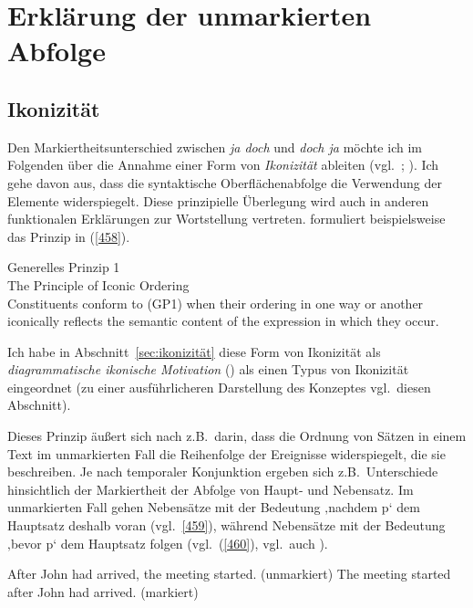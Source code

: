 \section{Erklärung der unmarkierten Abfolge}
\label{sec:unmarkiert} 
\subsection{Ikonizität}
Den Markiertheitsunterschied zwischen \textit{ja doch} und \textit{doch ja} möchte ich im Folgenden über die Annahme einer Form von \textit{Ikonizität} ableiten (vgl.\ \citealt[197--200]{Mueller2014a}; \citeyear[223--226]{Mueller2017b}). Ich gehe davon aus, dass die syntaktische Oberflächenabfolge die Verwendung der Elemente widerspiegelt. Diese prinzipielle Überlegung wird auch in anderen funktionalen Erklärungen zur Wortstellung vertreten. \citet[399]{Dik1997} formuliert beispielsweise das Prinzip in (\ref{458}).
\begin{exe}
	\ex\label{458} Generelles Prinzip 1\\
 		The Principle of Iconic Ordering\\
		Constituents  conform to (GP1) when their ordering in one way or another iconically reflects the semantic 				content of the expression in which they occur. 
	\hfill\hbox{\citet[399]{Dik1997}}
\end{exe}
Ich habe in Abschnitt~\ref{sec:ikonizität} diese Form von Ikonizität als \textit{diagrammatische ikonische Motivation} (\citealt[516]{Haiman1980})  als einen Typus von Ikonizität eingeordnet (zu einer ausführlicheren Darstellung des Konzeptes vgl.\ diesen Abschnitt).

Dieses Prinzip äußert sich nach \citet[399]{Dik1997} z.B.\ darin, dass die Ordnung von Sätzen in einem Text im unmarkierten Fall die Reihenfolge der Ereignisse widerspiegelt, die sie beschreiben. Je nach temporaler Konjunktion  ergeben sich z.B.\ Unterschiede hinsichtlich der Markiertheit der Abfolge von Haupt- und Nebensatz. Im unmarkierten Fall gehen Nebensätze mit der Bedeutung ‚nachdem p‘  dem Hauptsatz deshalb voran (vgl.\ \ref{459}), während Nebensätze mit der Bedeutung ‚bevor p‘  dem Hauptsatz folgen (vgl.\ (\ref{460}), vgl.\ auch \citealt{Diessel2008}).

\begin{exe}
	\ex\label{459} 
		\begin{xlist}
			\ex\label{459a} After John had arrived, the meeting started. (unmarkiert)
 			\ex\label{459b}	The meeting started after John had arrived. (markiert)
 		\end{xlist}		
\end{exe}

